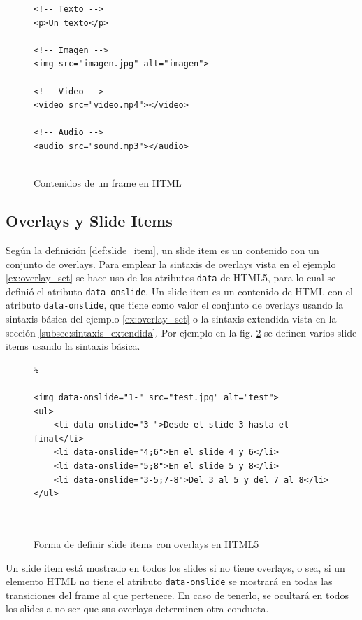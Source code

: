 				\begin{figure}[htb]%

					\begin{lstlisting}						
<!-- Texto -->
<p>Un texto</p>

<!-- Imagen -->
<img src="imagen.jpg" alt="imagen">

<!-- Video -->
<video src="video.mp4"></video>

<!-- Audio -->
<audio src="sound.mp3"></audio>		 							 					
 					 			

					\end{lstlisting}
					\caption{Contenidos de un frame en HTML}
					\label{fig:frames_html_content}
				\end{figure}	  
		


		\subsection{Overlays y Slide Items} %
		\label{sub:slide_items}
			Según la definición \ref{def:slide_item}, un slide item es un contenido con un conjunto de overlays. Para emplear la sintaxis de overlays vista en el ejemplo \ref{ex:overlay_set} se hace uso de los atributos \texttt{data} de HTML5, para lo cual se definió el atributo \texttt{data-onslide}. Un slide item es un contenido de HTML con el atributo \texttt{data-onslide}, que tiene como valor el conjunto de overlays usando la sintaxis básica del ejemplo \ref{ex:overlay_set} o la sintaxis extendida vista en la sección \ref{subsec:sintaxis_extendida}. Por ejemplo en la fig. \ref{fig:slide_items_html} se definen varios slide items usando la sintaxis básica.


				\begin{figure}[htb]%
					\begin{lstlisting}%

<img data-onslide="1-" src="test.jpg" alt="test">
<ul>
    <li data-onslide="3-">Desde el slide 3 hasta el final</li>
    <li data-onslide="4;6">En el slide 4 y 6</li>
    <li data-onslide="5;8">En el slide 5 y 8</li>
    <li data-onslide="3-5;7-8">Del 3 al 5 y del 7 al 8</li>
</ul> 

	
					\end{lstlisting}
					\caption{Forma de definir slide items con overlays en HTML5}
					\label{fig:slide_items_html}
				\end{figure}
			Un slide item está mostrado en todos los slides si no tiene overlays, o sea, si un elemento HTML no tiene el atributo \texttt{data-onslide} se mostrará en todas las transiciones del frame al que pertenece. En caso de tenerlo, se ocultará en todos los slides a no ser que sus overlays determinen otra conducta.


